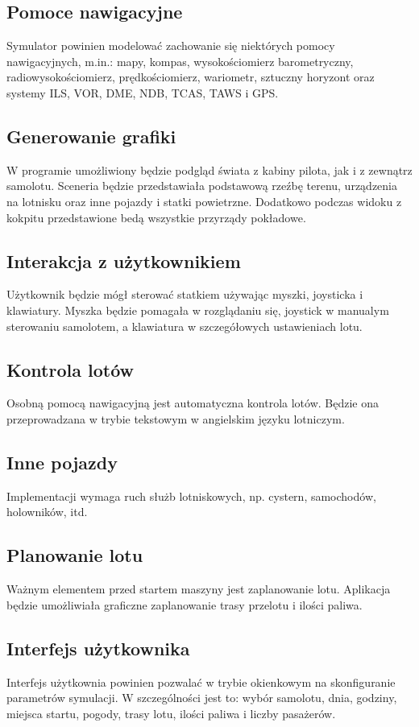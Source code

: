 \documentclass{mwrep}
\begin{document}
\subsection{Pomoce nawigacyjne}
Symulator powinien modelować zachowanie się niektórych pomocy nawigacyjnych, m.in.: mapy, kompas, wysokościomierz barometryczny, radiowysokościomierz, prędkościomierz, wariometr, sztuczny horyzont oraz systemy ILS, VOR, DME, NDB, TCAS, TAWS i GPS.

\subsection{Generowanie grafiki}
W programie umożliwiony będzie podgląd świata z kabiny pilota, jak i z zewnątrz samolotu. Sceneria będzie przedstawiała podstawową rzeźbę terenu, urządzenia na lotnisku oraz inne pojazdy i statki powietrzne. Dodatkowo podczas widoku z kokpitu przedstawione bedą wszystkie przyrządy pokładowe.

\subsection{Interakcja z użytkownikiem}
Użytkownik będzie mógł sterować statkiem używając myszki, joysticka i klawiatury. Myszka będzie pomagała w rozglądaniu się, joystick w manualym sterowaniu samolotem, a klawiatura w szczegółowych ustawieniach lotu.

\subsection{Kontrola lotów}
Osobną pomocą nawigacyjną jest automatyczna kontrola lotów. Będzie ona przeprowadzana w trybie tekstowym w angielskim języku lotniczym.

\subsection{Inne pojazdy}
Implementacji wymaga ruch służb lotniskowych, np. cystern, samochodów, holowników, itd. 

\subsection{Planowanie lotu}
Ważnym elementem przed startem maszyny jest zaplanowanie lotu. Aplikacja będzie umożliwiała graficzne zaplanowanie trasy przelotu i ilości paliwa.

\subsection{Interfejs użytkownika}
Interfejs użytkownia powinien pozwalać w trybie okienkowym na skonfiguranie parametrów symulacji. W szczególności jest to: wybór samolotu, dnia, godziny, miejsca startu, pogody, trasy lotu, ilości paliwa i liczby pasażerów.
\end{document}
